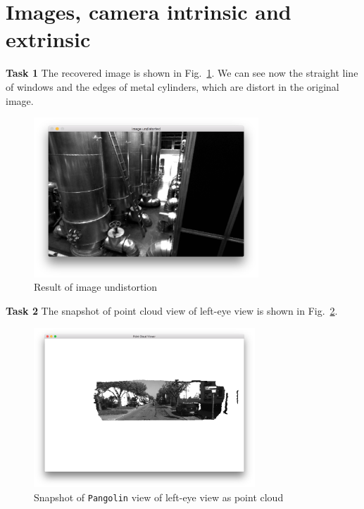 \documentclass[12pt,a4paper]{article}
\begin{document}
    \section{Images, camera intrinsic and extrinsic}
    \textsf{\textbf{Task 1}}
    The recovered image is shown in Fig.~\ref{fig:undistort_image}.
    We can see now the straight line of windows and the edges of metal cylinders,
    which are distort in the original image.
    \begin{figure}[!h]
        \centering
        \includegraphics[height=6cm]{fig/undistort_image.png}
        \caption{Result of image undistortion}
        \label{fig:undistort_image}
    \end{figure}

    \textsf{\textbf{Task 2}}
    The snapshot of point cloud view of left-eye view is shown in Fig.~\ref{fig:disparity}.
    \begin{figure}[!h]
        \centering
        \includegraphics[height=6cm]{fig/disparity.png}
        \caption{Snapshot of \texttt{Pangolin} view of left-eye view as point cloud}
        \label{fig:disparity}
    \end{figure}
\end{document}
